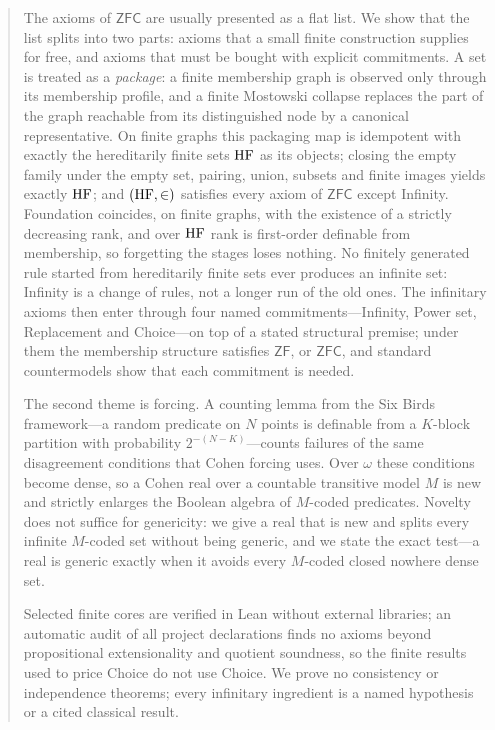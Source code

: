 \begin{abstract}
The axioms of $\mathsf{ZFC}$ are usually presented as a flat list. We show that the list splits
into two parts: axioms that a small finite construction supplies for free, and axioms that
must be bought with explicit commitments. A set is treated as a \emph{package}: a finite
membership graph is observed only through its membership profile, and a finite Mostowski
collapse replaces the part of the graph reachable from its distinguished node by a canonical
representative. On finite graphs this packaging map is
idempotent with exactly the hereditarily finite sets $\HF$ as its objects; closing the empty
family under the empty set, pairing, union, subsets and finite images yields exactly $\HF$; and $(\HF,\in)$
satisfies every axiom of $\mathsf{ZFC}$ except Infinity. Foundation coincides, on finite graphs,
with the existence of a strictly decreasing rank, and over $\HF$ rank is first-order
definable from membership, so forgetting the stages loses nothing. No finitely generated rule started from hereditarily finite sets ever produces an
infinite set: Infinity is a change of rules, not a longer run of the old ones. The infinitary
axioms then enter through four named commitments---Infinity, Power set, Replacement and
Choice---on top of a stated structural premise; under them the membership structure satisfies
$\mathsf{ZF}$, or $\mathsf{ZFC}$, and standard countermodels show that each commitment is needed.

The second theme is forcing. A counting lemma from the Six Birds framework---a random predicate
on $N$ points is definable from a $K$-block partition with probability $2^{-(N-K)}$---counts
failures of the same disagreement conditions that Cohen forcing uses. Over $\omega$ these
conditions become dense, so a Cohen real over a countable transitive model $M$ is new and strictly
enlarges the Boolean algebra of $M$-coded predicates. Novelty does not suffice for genericity: we
give a real that is new and splits every infinite $M$-coded set without being generic, and we
state the exact test---a real is generic exactly when it avoids every $M$-coded closed nowhere
dense set.

Selected finite cores are verified in Lean without external libraries; an automatic audit of
all project declarations finds no axioms beyond propositional extensionality and quotient
soundness, so the finite results used to price Choice do not use Choice. We prove no consistency
or independence theorems; every infinitary ingredient is a named hypothesis or a cited
classical result.
\end{abstract}
